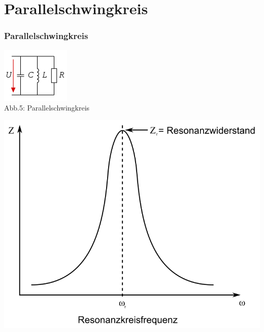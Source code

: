\section*{Parallel\-schwing\-kreis}
\begin{frame}
\frametitle{Parallelschwingkreis}
\begin{center}
	\begin{minipage}{0.4\textwidth}
	\includegraphics[width=\textwidth,height=.5\textheight,keepaspectratio]{e07/Parallelschw.png}\\
	\tiny{Abb.5: Parallelschwingkreis \cite{wmen}}
	\end{minipage}
	\begin{minipage}{0.4\textwidth}
	\includegraphics[width=\textwidth,height=.5\textheight,keepaspectratio]{e07/ParallelschwSig.png}\\

\end{minipage}
\end{center}
\end{frame}
